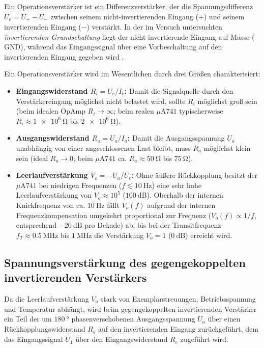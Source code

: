 \documentclass[12pt,a4paper,titlepage]{scrartcl}
\numberwithin{equation}{section}
\numberwithin{table}{section}
\numberwithin{figure}{section}
\begin{document}
Ein Operationsverstärker ist ein Differenzverstärker, der die Spannungsdifferenz $U_e = U_+ - U_-$ zwischen seinem nicht-invertierenden Eingang ($+$) und seinem invertierenden Eingang ($-$) verstärkt. In der im Versuch untersuchten \emph{invertierenden Grundschaltung} liegt der nicht-invertierende Eingang auf Masse ($\text{GND}$), während das Eingangssignal über eine Vorbeschaltung auf den invertierenden Eingang gegeben wird \cite{PAPskript}.

Ein Operationsverstärker wird im Wesentlichen durch drei Größen charakterisiert:
\begin{itemize}
    \item \textbf{Eingangswiderstand $R_i = U_e / I_e$:} Damit die Signalquelle durch den Verstärkereingang möglichst nicht belastet wird, sollte $R_i$ möglichst groß sein (beim idealen OpAmp $R_i \to \infty$; beim realen $\mu\text{A}741$ typischerweise $R_i \approx \SI{1e6}{\ohm}$ bis $\SI{2e6}{\ohm}$).
    \item \textbf{Ausgangswiderstand $R_a = U_a / I_a$:} Damit die Ausgangsspannung $U_a$ unabhängig von einer angeschlossenen Last bleibt, muss $R_a$ möglichst klein sein (ideal $R_a \to 0$; beim $\mu\text{A}741$ ca. $R_a \approx \SI{50}{\ohm}$ bis $\SI{75}{\ohm}$).
    \item \textbf{Leerlaufverstärkung $V_o = -U_a / U_e$:} Ohne äußere Rückkopplung besitzt der $\mu\text{A}741$ bei niedrigen Frequenzen ($f \lesssim \SI{10}{\hertz}$) eine sehr hohe Leerlaufverstärkung von $V_o \approx 10^5$ ($\SI{100}{\deci\bel}$). Oberhalb der internen Knickfrequenz von ca. $\SI{10}{\hertz}$ fällt $V_o(f)$ aufgrund der internen Frequenzkompensation umgekehrt proportional zur Frequenz ($V_o(f) \propto 1/f$, entsprechend $\SI{-20}{\deci\bel}$ pro Dekade) ab, bis bei der Transitfrequenz $f_T \approx \SI{0.5}{\mega\hertz}$ bis $\SI{1}{\mega\hertz}$ die Verstärkung $V_o = 1$ ($\SI{0}{\deci\bel}$) erreicht wird.
\end{itemize}

\subsection{Spannungsverstärkung des gegengekoppelten invertierenden Verstärkers}

Da die Leerlaufverstärkung $V_o$ stark von Exemplarstreuungen, Betriebsspannung und Temperatur abhängt, wird beim gegengekoppelten invertierenden Verstärker ein Teil der um $\SI{180}{\degree}$ phasenverschobenen Ausgangsspannung $U_a$ über einen Rückkopplungswiderstand $R_g$ auf den invertierenden Eingang zurückgeführt, dem das Eingangssignal $U_1$ über den Eingangswiderstand $R_e$ zugeführt wird.
\end{document}
